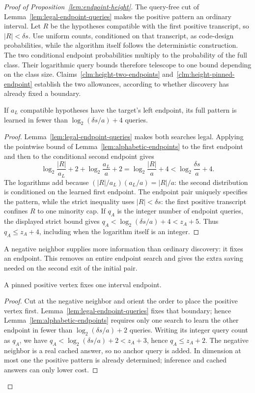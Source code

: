 \begin{proof}[Proof of Proposition~\ref{lem:endpoint-height}]
The query-free cut of Lemma~\ref{lem:legal-endpoint-queries} makes the
positive pattern an ordinary interval. Let $R$ be the hypotheses
compatible with the first positive transcript, so $|R|<\delta s$.
Use uniform counts, conditioned on that transcript, as code-design
probabilities, while the algorithm itself follows the deterministic
construction.
The two conditional endpoint probabilities multiply to the probability
of the full class. Their logarithmic query bounds therefore telescope
to one bound depending on the class size.
Claims~\ref{clm:height-two-endpoints} and~\ref{clm:height-pinned-endpoint}
establish the two allowances, according to whether discovery has
already fixed a boundary.

\begin{claim}
\label{clm:height-two-endpoints}
If $a_L$ compatible hypotheses have the target's left endpoint, its
full pattern is learned in fewer than $\log_2(\delta s/a)+4$ queries.
\end{claim}
\begin{proof}
Lemma~\ref{lem:legal-endpoint-queries} makes both searches legal.
Applying the pointwise bound of Lemma~\ref{lem:alphabetic-endpoints}
to the first endpoint and then to the conditional second endpoint gives
\[
 \log_2\frac{|R|}{a_L}+2+
 \log_2\frac{a_L}{a}+2
 =\log_2\frac{|R|}{a}+4<\log_2\frac{\delta s}{a}+4.
\]
The logarithms add because
$(|R|/a_L)(a_L/a)=|R|/a$: the second distribution is conditioned
on the learned first endpoint. The endpoint pair uniquely specifies
the pattern, while the strict inequality uses $|R|<\delta s$:
the first positive transcript confines $R$ to one minority cap.
If $q_A$ is the integer number of endpoint queries,
the displayed strict bound gives
$q_A<\log_2(\delta s/a)+4<z_A+5$. Thus
$q_A\le z_A+4$, including when the logarithm itself is an integer.
\end{proof}
A negative neighbor supplies more information than ordinary discovery:
it fixes an endpoint. This removes an entire endpoint search and gives
the extra saving needed on the second exit of the initial pair.

\begin{claim}
\label{clm:height-pinned-endpoint}
A pinned positive vertex fixes one interval endpoint.
\end{claim}
\begin{proof}
Cut at the negative neighbor and orient the order to place the
positive vertex first. Lemma~\ref{lem:legal-endpoint-queries}
fixes that boundary; hence Lemma~\ref{lem:alphabetic-endpoints}
requires only one search to learn the other endpoint
in fewer than $\log_2(\delta s/a)+2$ queries. Writing its integer
query count as $q_A$, we have
$q_A<\log_2(\delta s/a)+2<z_A+3$, hence $q_A\le z_A+2$.
The negative neighbor is a real cached answer, so no anchor
query is added. In dimension at most one the positive pattern is
already determined; inference and cached answers can only lower cost.
\end{proof}
\end{proof}

